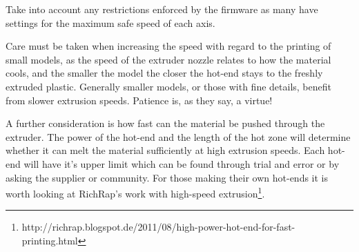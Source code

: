 Take into account any restrictions enforced by the firmware as many have settings for the maximum safe speed of each axis.

Care must be taken when increasing the speed with regard to the printing of small models, as the speed of the extruder nozzle relates to how the material cools, and the smaller the model the closer the hot-end stays to the freshly extruded plastic.  Generally smaller models, or those with fine details, benefit from slower extrusion speeds.  Patience is, as they say, a virtue!

A further consideration is how fast can the material be pushed through the extruder.  The power of the hot-end and the length of the hot zone will determine whether it can melt the material sufficiently at high extrusion speeds.  Each hot-end will have it's upper limit which can be found through trial and error or by asking the supplier or community.  For those making their own hot-ends it is worth looking at RichRap's work with high-speed extrusion\footnote{http://richrap.blogspot.de/2011/08/high-power-hot-end-for-fast-printing.html}.


